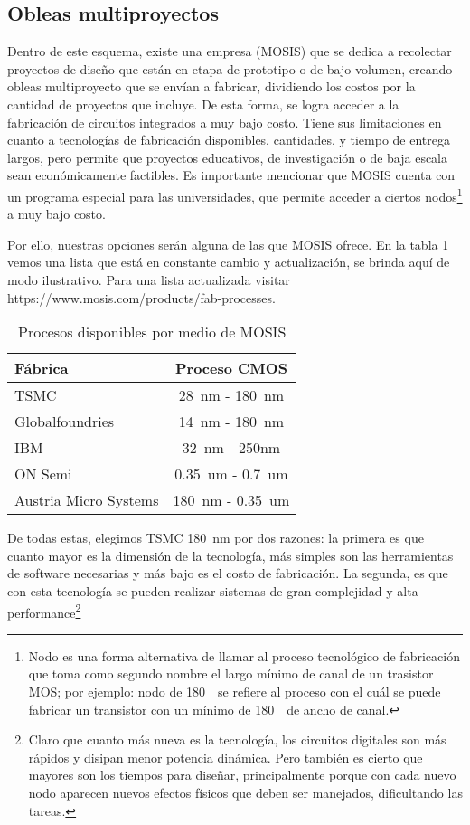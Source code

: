 \subsection{Obleas multiproyectos}
Dentro de este esquema, existe una empresa (MOSIS) que se dedica a recolectar proyectos de diseño que están en etapa de prototipo o de bajo volumen, creando obleas multiproyecto que se envían a fabricar, dividiendo los costos por la cantidad de proyectos que incluye. De esta forma, se logra acceder a la fabricación de circuitos integrados a muy bajo costo. Tiene sus limitaciones en cuanto a tecnologías de fabricación disponibles, cantidades, y tiempo de entrega largos, pero permite que proyectos educativos, de investigación o de baja escala sean económicamente factibles. Es importante mencionar que MOSIS cuenta con un programa especial para las universidades, que permite acceder a ciertos nodos\footnote{Nodo es una forma alternativa de llamar al proceso tecnológico de fabricación que toma como segundo nombre el largo mínimo de canal de un trasistor MOS; por ejemplo: nodo de 180~\nanom ~se refiere al proceso con el cuál se puede fabricar un transistor con un mínimo de 180~\nanom~de ancho de canal.} a muy bajo costo.

Por ello, nuestras opciones serán alguna de las que MOSIS ofrece. En la tabla \ref{tab:procesosDisponibles} vemos una lista que está en constante cambio y actualización, se brinda aquí de modo ilustrativo. Para una lista actualizada visitar https://www.mosis.com/products/fab-processes.

\begin{table}[h]
\centering
\begin{tabular}{@{}lc@{}}
\toprule
Fábrica             & Proceso CMOS \\ \midrule
TSMC                & 28~nm - 180~nm             \\
Globalfoundries     & 14~nm - 180~nm             \\
IBM                 & 32~nm -  250nm            \\
ON Semi             & 0.35~um - 0.7~um           \\
Austria Micro Systems & 180~nm - 0.35~um           \\ \bottomrule
\end{tabular}
\caption{Procesos disponibles por medio de MOSIS}
\label{tab:procesosDisponibles}
\end{table}

De todas estas, elegimos TSMC 180~nm por dos razones: la primera es que cuanto mayor es la dimensión de la tecnología, más simples son las herramientas de software necesarias y más bajo es el costo de fabricación. La segunda, es que con esta tecnología se pueden realizar sistemas de gran complejidad y alta performance\footnote{Claro que cuanto más nueva es la tecnología, los circuitos digitales son más rápidos y disipan menor potencia dinámica. Pero también es cierto que mayores son los tiempos para diseñar, principalmente porque con cada nuevo nodo aparecen nuevos efectos físicos que deben ser manejados, dificultando las tareas.
}

